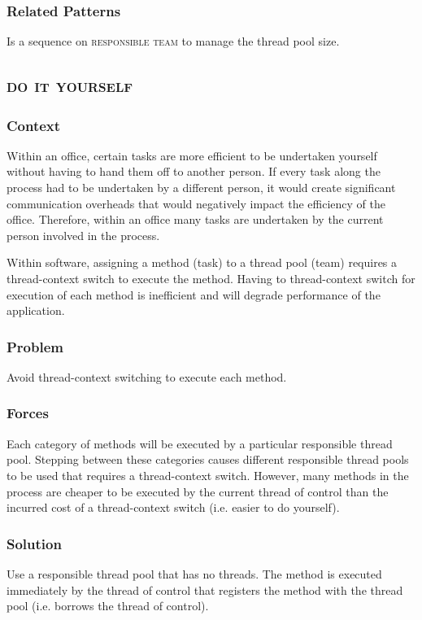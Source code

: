 \documentclass[prodmode]{style/acmlarge}
\begin{document}
\subsubsection*{Related Patterns} Is a sequence on \textsc{responsible team} to
manage the thread pool size.



\subsection{\textsc{\textbf{do it yourself}}}

\subsubsection*{Context} Within an office, certain tasks are more efficient to
be undertaken yourself without having to hand them off to another person.  If
every task along the process had to be undertaken by a different person, it
would create significant communication overheads that would negatively impact
the efficiency of the office.  Therefore, within an office many tasks are
undertaken by the current person involved in the process.

Within software, assigning a method (task) to a thread pool (team) requires a
thread-context switch to execute the method.  Having to thread-context switch
for execution of each method is inefficient and will degrade performance of the
application.

\subsubsection*{\textbf{Problem}} Avoid thread-context switching to execute each method.

\subsubsection*{Forces} Each category of methods will be executed by a
particular responsible thread pool.  Stepping between these categories causes
different responsible thread pools to be used that requires a thread-context
switch.  However, many methods in the process are cheaper to be executed by the
current thread of control than the incurred cost of a thread-context switch
(i.e. easier to do yourself).

\subsubsection*{\textbf{Solution}} Use a responsible thread pool that has no threads.
The method is executed immediately by the thread of control that registers the
method with the thread pool (i.e. borrows the thread of control).
\end{document}
